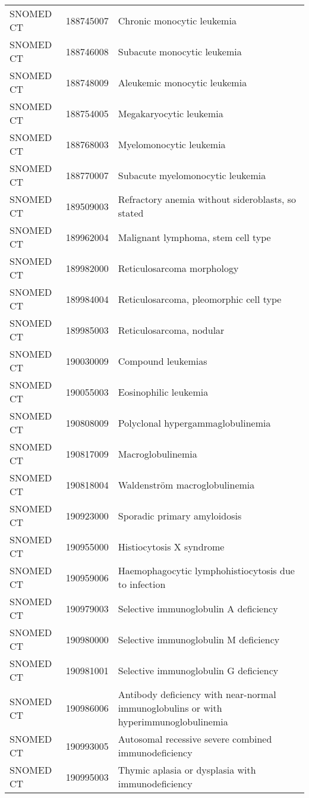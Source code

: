 \begin{longtable}{p{}p{}p{}}
  SNOMED CT & 188745007 & Chronic monocytic leukemia \\ 
  SNOMED CT & 188746008 & Subacute monocytic leukemia \\ 
  SNOMED CT & 188748009 & Aleukemic monocytic leukemia \\ 
  SNOMED CT & 188754005 & Megakaryocytic leukemia \\ 
  SNOMED CT & 188768003 & Myelomonocytic leukemia \\ 
  SNOMED CT & 188770007 & Subacute myelomonocytic leukemia \\ 
  SNOMED CT & 189509003 & Refractory anemia without sideroblasts, so stated \\ 
  SNOMED CT & 189962004 & Malignant lymphoma, stem cell type \\ 
  SNOMED CT & 189982000 & Reticulosarcoma morphology \\ 
  SNOMED CT & 189984004 & Reticulosarcoma, pleomorphic cell type \\ 
  SNOMED CT & 189985003 & Reticulosarcoma, nodular \\ 
  SNOMED CT & 190030009 & Compound leukemias \\ 
  SNOMED CT & 190055003 & Eosinophilic leukemia \\ 
  SNOMED CT & 190808009 & Polyclonal hypergammaglobulinemia \\ 
  SNOMED CT & 190817009 & Macroglobulinemia \\ 
  SNOMED CT & 190818004 & Waldenström macroglobulinemia \\ 
  SNOMED CT & 190923000 & Sporadic primary amyloidosis \\ 
  SNOMED CT & 190955000 & Histiocytosis X syndrome \\ 
  SNOMED CT & 190959006 & Haemophagocytic lymphohistiocytosis due to infection \\ 
  SNOMED CT & 190979003 & Selective immunoglobulin A deficiency \\ 
  SNOMED CT & 190980000 & Selective immunoglobulin M deficiency \\ 
  SNOMED CT & 190981001 & Selective immunoglobulin G deficiency \\ 
  SNOMED CT & 190986006 & Antibody deficiency with near-normal immunoglobulins or with hyperimmunoglobulinemia \\ 
  SNOMED CT & 190993005 & Autosomal recessive severe combined immunodeficiency \\ 
  SNOMED CT & 190995003 & Thymic aplasia or dysplasia with immunodeficiency \\ 

\end{longtable}
